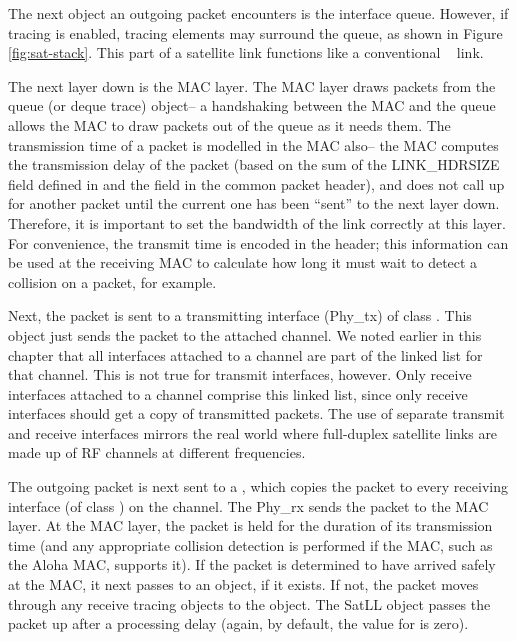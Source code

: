 The next object an outgoing packet encounters is the interface queue.  
However, if tracing is enabled, tracing elements may surround the
queue, as shown in Figure \ref{fig:sat-stack}.  This part of a satellite
link functions like a conventional \ns~ link.

The next layer down is the MAC layer.  The MAC layer draws packets from
the queue (or deque trace) object-- a handshaking between the MAC and the 
queue allows the MAC to draw packets out of the queue as it needs them.  The
transmission time of a packet is modelled in the MAC also-- the MAC computes
the transmission delay of the packet (based on the sum of the 
LINK\_HDRSIZE field defined in  and the  field 
in the common packet header), and does not call up for another packet until
the current one has been ``sent'' to the next layer down.  Therefore, it
is important to set the bandwidth of the link correctly at this layer.
For convenience, the transmit time is encoded in the  header; this
information can be used at the receiving MAC to calculate how long it must
wait to detect a collision on a packet, for example.

Next, the packet is sent to a transmitting interface (Phy\_tx) of class 
.  This
object just sends the packet to the attached channel.  We noted earlier
in this chapter that all interfaces attached to a channel are part of the
linked list for that channel.  This is not true for transmit interfaces,
however.  Only receive interfaces attached to a channel comprise this linked
list, since only receive interfaces should get a copy of transmitted packets.
The use of separate transmit and receive interfaces mirrors the real world
where full-duplex satellite links are made up of RF channels at different
frequencies.

The outgoing packet is next sent to a , which copies the
packet to every receiving interface (of class ) on the channel. 
The Phy\_rx sends the packet to the MAC layer.  At the MAC layer, the packet
is held for the duration of its transmission time (and any appropriate
collision detection is performed if the MAC, such as the Aloha MAC,
supports it).  If the packet is determined to have arrived safely at the MAC,
it next passes to an  object, if it exists.  If not, the
packet moves through any receive tracing objects to the 
object.  The SatLL object passes the packet up after a processing delay
(again, by default, the value for  is zero).

